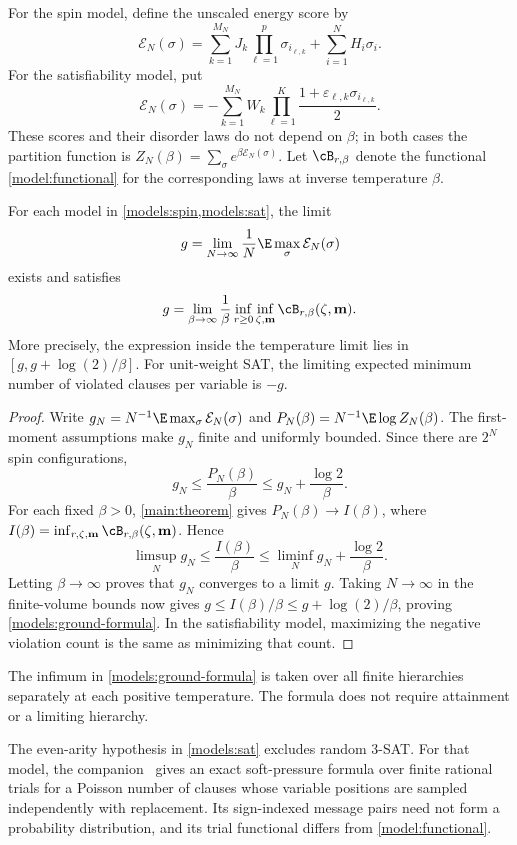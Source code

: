 For the spin model, define the unscaled energy score by
\[
 \mathcal E_N(\sigma)
 =\sum_{k=1}^{M_N}J_k\prod_{\ell=1}^p\sigma_{i_{\ell,k}}
   +\sum_{i=1}^N H_i\sigma_i.
\]
For the satisfiability model, put
\[
 \mathcal E_N(\sigma)
 =-\sum_{k=1}^{M_N}W_k
      \prod_{\ell=1}^K\frac{1+\varepsilon_{\ell,k}
       \sigma_{i_{\ell,k}}}{2}.
\]
These scores and their disorder laws do not depend on $\beta$; in
both cases the partition function is
$Z_N(\beta)=\sum_\sigma e^{\beta\mathcal E_N(\sigma)}$.
Let $\cB_{r,\beta}$ denote the functional
\eqref{model:functional} for the corresponding laws at inverse
temperature $\beta$.

\begin{corollary}
\label{models:ground}
For each model in \cref{models:spin,models:sat}, the limit
\[
 g=\lim_{N\to\infty}\frac1N\E\max_\sigma\mathcal E_N(\sigma)
\]
exists and satisfies
\begin{equation}\label{models:ground-formula}
 g=\lim_{\beta\to\infty}\frac1\beta
       \inf_{r\ge0}\inf_{\zeta,\mathbf m}
          \cB_{r,\beta}(\zeta,\mathbf m).
\end{equation}
More precisely, the expression inside the temperature limit lies in
$[g,g+\log(2)/\beta]$. For unit-weight SAT, the limiting expected
minimum number of violated clauses per variable is $-g$.
\end{corollary}

\begin{proof}
Write $g_N=N^{-1}\E\max_\sigma\mathcal E_N(\sigma)$ and
$P_N(\beta)=N^{-1}\E\log Z_N(\beta)$. The first-moment assumptions
make $g_N$ finite and uniformly bounded. Since there are $2^N$ spin
configurations,
\[
 g_N\le\frac{P_N(\beta)}\beta
       \le g_N+\frac{\log2}{\beta}.
\]
For each fixed $\beta>0$, \cref{main:theorem} gives
$P_N(\beta)\to I(\beta)$, where
$I(\beta)=\inf_{r,\zeta,\mathbf m}\cB_{r,\beta}(\zeta,\mathbf m)$.
Hence
\[
 \limsup_N g_N\le\frac{I(\beta)}\beta
   \le\liminf_N g_N+\frac{\log2}{\beta}.
\]
Letting $\beta\to\infty$ proves that $g_N$ converges to a limit $g$.
Taking $N\to\infty$ in the finite-volume bounds now gives
$g\le I(\beta)/\beta\le g+\log(2)/\beta$, proving
\eqref{models:ground-formula}. In the satisfiability model, maximizing
the negative violation count is the same as minimizing that count.
\end{proof}

The infimum in \eqref{models:ground-formula} is taken over all finite
hierarchies separately at each positive temperature. The formula
does not require attainment or a limiting hierarchy.

\begin{remark}
The even-arity hypothesis in \cref{models:sat} excludes random 3-SAT.
For that model, the companion~\cite[Theorem~8.4]{OpenAIThreeSAT2026}
gives an exact soft-pressure formula over finite rational trials for a
Poisson number of clauses whose variable positions are sampled independently
with replacement. Its sign-indexed message pairs need not form a probability
distribution, and its trial functional differs from \eqref{model:functional}.
\end{remark}

